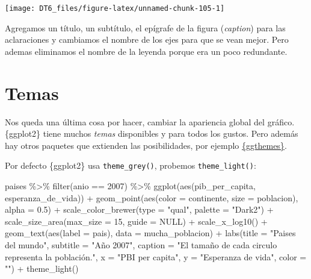 \documentclass[
  openany]{book}
\newenvironment{Shaded}{\begin{snugshade}}{\end{snugshade}}
\newcommand{\AttributeTok}[1]{\textcolor[rgb]{0.77,0.63,0.00}{#1}}
\newcommand{\ConstantTok}[1]{\textcolor[rgb]{0.00,0.00,0.00}{#1}}
\newcommand{\DecValTok}[1]{\textcolor[rgb]{0.00,0.00,0.81}{#1}}
\newcommand{\FloatTok}[1]{\textcolor[rgb]{0.00,0.00,0.81}{#1}}
\newcommand{\FunctionTok}[1]{\textcolor[rgb]{0.00,0.00,0.00}{#1}}
\newcommand{\NormalTok}[1]{#1}
\newcommand{\SpecialCharTok}[1]{\textcolor[rgb]{0.00,0.00,0.00}{#1}}
\newcommand{\StringTok}[1]{\textcolor[rgb]{0.31,0.60,0.02}{#1}}
\begin{document}
\begin{center}\texttt{[image: DT6\_files/figure-latex/unnamed-chunk-105-1]} \end{center}

Agregamos un título, un subtítulo, el epígrafe de la figura (\emph{caption}) para las aclaraciones y cambiamos el nombre de los ejes para que se vean mejor.
Pero ademas eliminamos el nombre de la leyenda porque era un poco redundante.

\hypertarget{temas}{%
\section{Temas}\label{temas}}

Nos queda una última cosa por hacer, cambiar la apariencia global del gráfico.
\{ggplot2\} tiene muchos \emph{temas} disponibles y para todos los gustos.
Pero además hay otros paquetes que extienden las posibilidades, por ejemplo \href{https://github.com/jrnold/ggthemes}{\{ggthemes\}}.

Por defecto \{ggplot2\} usa \texttt{theme\_grey()}, probemos \texttt{theme\_light()}:

\begin{Shaded}
\begin{Highlighting}[]
\NormalTok{paises }\SpecialCharTok{\%\textgreater{}\%} 
  \FunctionTok{filter}\NormalTok{(anio }\SpecialCharTok{==} \DecValTok{2007}\NormalTok{) }\SpecialCharTok{\%\textgreater{}\%} 
  \FunctionTok{ggplot}\NormalTok{(}\FunctionTok{aes}\NormalTok{(pib\_per\_capita, esperanza\_de\_vida)) }\SpecialCharTok{+}
  \FunctionTok{geom\_point}\NormalTok{(}\FunctionTok{aes}\NormalTok{(}\AttributeTok{color =}\NormalTok{ continente, }\AttributeTok{size =}\NormalTok{ poblacion), }\AttributeTok{alpha =} \FloatTok{0.5}\NormalTok{) }\SpecialCharTok{+}
  \FunctionTok{scale\_color\_brewer}\NormalTok{(}\AttributeTok{type =} \StringTok{"qual"}\NormalTok{, }\AttributeTok{palette =} \StringTok{"Dark2"}\NormalTok{) }\SpecialCharTok{+}
  \FunctionTok{scale\_size\_area}\NormalTok{(}\AttributeTok{max\_size =} \DecValTok{15}\NormalTok{, }\AttributeTok{guide =} \ConstantTok{NULL}\NormalTok{) }\SpecialCharTok{+}
  \FunctionTok{scale\_x\_log10}\NormalTok{() }\SpecialCharTok{+}
  \FunctionTok{geom\_text}\NormalTok{(}\FunctionTok{aes}\NormalTok{(}\AttributeTok{label =}\NormalTok{ pais), }\AttributeTok{data =}\NormalTok{ mucha\_poblacion) }\SpecialCharTok{+}
  \FunctionTok{labs}\NormalTok{(}\AttributeTok{title =} \StringTok{"Paises del mundo"}\NormalTok{,}
       \AttributeTok{subtitle =} \StringTok{"Año 2007"}\NormalTok{,}
       \AttributeTok{caption =} \StringTok{"El tamaño de cada circulo representa la población."}\NormalTok{,}
       \AttributeTok{x =} \StringTok{"PBI per capita"}\NormalTok{,}
       \AttributeTok{y =} \StringTok{"Esperanza de vida"}\NormalTok{,}
       \AttributeTok{color =} \StringTok{""}\NormalTok{) }\SpecialCharTok{+}
  \FunctionTok{theme\_light}\NormalTok{()}
\end{Highlighting}
\end{Shaded}
\end{document}
